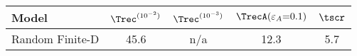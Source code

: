 \begin{tabular}{lcccc}
\toprule
Model & $\Trec^{(10^{-2})}$ & $\Trec^{(10^{-3})}$ & $\TrecA(\varepsilon_A{=}0.1)$ & $\tscr$ \\
\midrule
Random Finite-D & 45.6 & n/a & 12.3 & 5.7 \\
\bottomrule
\end{tabular}
